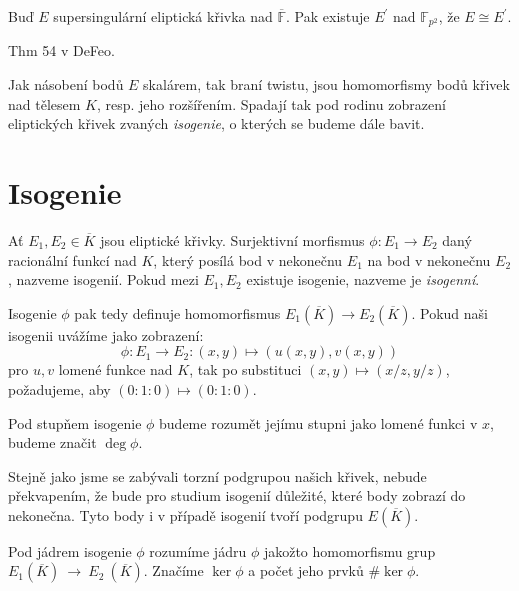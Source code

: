 \documentclass [12pt]{report}
\begin{document}
\begin{veta}
Buď $E$ supersingulární eliptická křivka nad $\overline{\mathbb{F}}$. Pak existuje $E^\prime$ nad $\mathbb{F}_{p^2}$, že $E \cong E^\prime$.
\end{veta}

\begin{veta}
Thm 54 v DeFeo. 
\end{veta}


Jak násobení bodů $E$ skalárem, tak braní twistu, jsou homomorfismy bodů křivek nad tělesem $K$, resp. jeho rozšířením. Spadají tak pod rodinu zobrazení eliptických křivek zvaných \textit{isogenie}, o kterých se budeme dále bavit.

\section{Isogenie}



\begin{definice}
Ať $E_1,E_2 \in \overline{K}$ jsou eliptické křivky. Surjektivní morfismus $\phi: E_1 \longrightarrow E_2$  daný racionální funkcí nad $K$,  který posílá bod v nekonečnu $E_1$ na bod v nekonečnu $E_2$, nazveme isogenií. Pokud mezi $E_1,E_2$ existuje isogenie, nazveme je \textit{isogenní}.
\end{definice}

Isogenie $\phi$ pak tedy definuje homomorfismus $E_1(\overline{K}) \longrightarrow E_2 (\overline{K})$. Pokud naši isogenii uvážíme jako zobrazení:
\begin{equation*}
\phi: E_1 \longrightarrow E_2 :  (x,y) \mapsto (u(x,y),v(x,y))
\end{equation*}
pro $u,v$ lomené funkce nad $K$, tak po substituci $(x,y) \mapsto (x/z,y/z)$, požadujeme, aby $(0:1:0) \mapsto (0:1:0)$. 

\begin{definice}
Pod stupňem isogenie $\phi$ budeme rozumět jejímu stupni jako lomené funkci v $x$, budeme značit $\deg \phi$. 
\end{definice}

Stejně jako jsme se zabývali torzní podgrupou našich křivek, nebude překvapením, že bude pro studium isogenií důležité, které body zobrazí do nekonečna. Tyto body i v případě isogenií tvoří podgrupu $E(\overline{K})$.


\begin{definice}
Pod jádrem isogenie $\phi$ rozumíme jádru $\phi$ jakožto homomorfismu grup $E_1 (\overline{K})~\longrightarrow~E_2~(\overline{K})$. Značíme $\ker \phi$ a počet jeho prvků $\# \ker \phi$. 
\end{definice}
\end{document}
